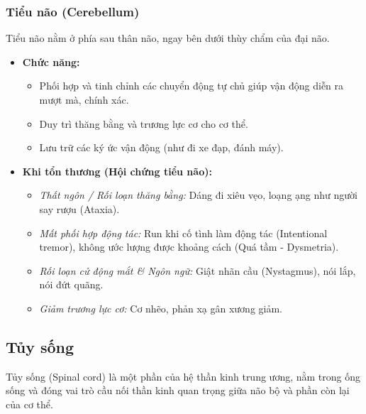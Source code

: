 \subsubsection{Tiểu não (Cerebellum)}

Tiểu não nằm ở phía sau thân não, ngay bên dưới thùy chẩm của đại não.

\begin{itemize}
    \item \textbf{Chức năng:}
    \begin{itemize}
        \item Phối hợp và tinh chỉnh các chuyển động tự chủ giúp vận động diễn ra mượt mà, chính xác.
        \item Duy trì thăng bằng và trương lực cơ cho cơ thể.
        \item Lưu trữ các ký ức vận động (như đi xe đạp, đánh máy).
    \end{itemize}

    \item \textbf{Khi tổn thương (Hội chứng tiểu não):}
    \begin{itemize}
        \item \textit{Thất ngôn / Rối loạn thăng bằng:} Dáng đi xiêu vẹo, loạng ạng như người say rượu (Ataxia).
        \item \textit{Mất phối hợp động tác:} Run khi cố tình làm động tác (Intentional tremor), không ước lượng được khoảng cách (Quá tầm - Dysmetria).
        \item \textit{Rối loạn cử động mắt \& Ngôn ngữ:} Giật nhãn cầu (Nystagmus), nói lắp, nói đứt quãng.
        \item \textit{Giảm trương lực cơ:} Cơ nhẽo, phản xạ gân xương giảm.
    \end{itemize}
\end{itemize}

\subsection{Tủy sống}

Tủy sống (Spinal cord) là một phần của hệ thần kinh trung ương, nằm trong ống sống và đóng vai trò cầu nối thần kinh quan trọng giữa não bộ và phần còn lại của cơ thể.

